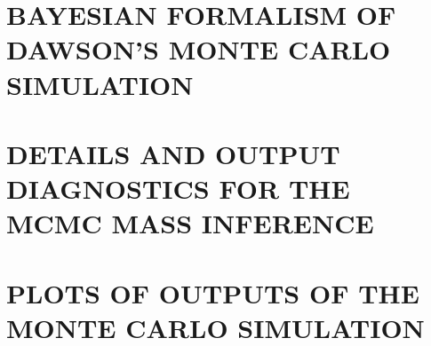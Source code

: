 


\appendix

\section{BAYESIAN FORMALISM OF DAWSON'S MONTE CARLO SIMULATION}


\section{DETAILS AND OUTPUT DIAGNOSTICS FOR THE MCMC MASS INFERENCE}\label{app:MCMC}


\section{PLOTS OF OUTPUTS OF THE MONTE CARLO SIMULATION}


\bsp 
\label{lastpage} 


